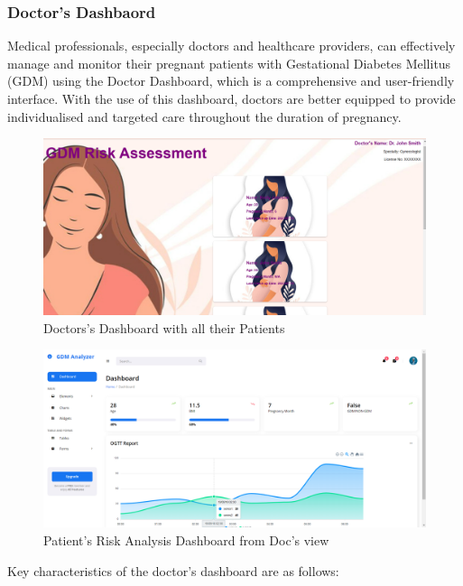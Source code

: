 \documentclass[conference,compsoc]{IEEEtran}
\begin{document}
\subsubsection{Doctor's Dashbaord}
Medical professionals, especially doctors and healthcare providers, can effectively manage and monitor their pregnant patients with Gestational Diabetes Mellitus (GDM) using the Doctor Dashboard, which is a comprehensive and user-friendly interface. With the use of this dashboard, doctors are better equipped to provide individualised and targeted care throughout the duration of pregnancy.
\begin{figure}[!htbp]
  \centering
  \includegraphics[width=0.8\columnwidth]{doc.png} %
  \caption{Doctors's Dashboard with all their Patients }
  \label{fig:glucometer_diag}
\end{figure}
\begin{figure}[!htbp]
  \centering
  \includegraphics[width=0.8\columnwidth]{doc2.png} %
  \caption{Patient's Risk Analysis Dashboard from Doc's view}
  \label{fig:glucometer_diag}
\end{figure}
Key characteristics of the doctor's dashboard are as follows:
\end{document}
